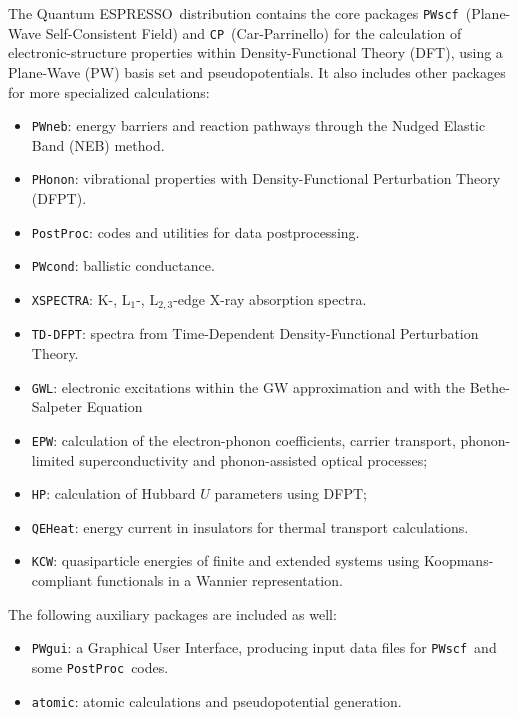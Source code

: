 \documentclass[12pt,a4paper]{article}
\def\qe{{\sc Quantum ESPRESSO}}
\def\PWscf{\texttt{PWscf}}
\def\PHonon{\texttt{PHonon}}
\def\CP{\texttt{CP}}
\def\PostProc{\texttt{PostProc}}
\def\NEB{\texttt{PWneb}}
\begin{document}
The \qe\ distribution contains the core packages \PWscf\ (Plane-Wave
Self-Consistent Field) and \CP\ (Car-Parrinello) for the calculation
of electronic-structure properties within
Density-Functional Theory (DFT), using a Plane-Wave (PW) basis set
and pseudopotentials. It also includes other packages for
more specialized calculations:
\begin{itemize}
  \item \NEB:
        energy barriers and reaction pathways through the Nudged Elastic Band
        (NEB) method.
      \item \PHonon:
        vibrational properties  with Density-Functional Perturbation Theory
        (DFPT).
  \item \PostProc:
        codes and utilities for data postprocessing.
  \item \texttt{PWcond}:
        ballistic conductance.
  \item \texttt{XSPECTRA}:
        K-, L$_1$-, L$_{2,3}$-edge X-ray absorption spectra.
  \item \texttt{TD-DFPT}:
        spectra from Time-Dependent
        Density-Functional Perturbation Theory.
  \item \texttt{GWL}: electronic excitations within the GW approximation
        and with the Bethe-Salpeter Equation
  \item \texttt{EPW}: calculation of the electron-phonon coefficients,
        carrier transport, phonon-limited superconductivity and phonon-assisted
        optical processes;
  \item \texttt{HP}: calculation of Hubbard $U$ parameters using DFPT;
  \item \texttt{QEHeat}: energy current in insulators for thermal
        transport calculations.
  \item \texttt{KCW}: quasiparticle energies of finite and extended systems
        using Koopmans-compliant functionals in a Wannier representation.
\end{itemize}
The following auxiliary packages are included as well:
\begin{itemize}
\item \texttt{PWgui}:
      a Graphical User Interface, producing input data files for
      \PWscf\ and some \PostProc\ codes.
\item \texttt{atomic}:
      atomic calculations and pseudopotential generation.
\end{itemize}
\end{document}
